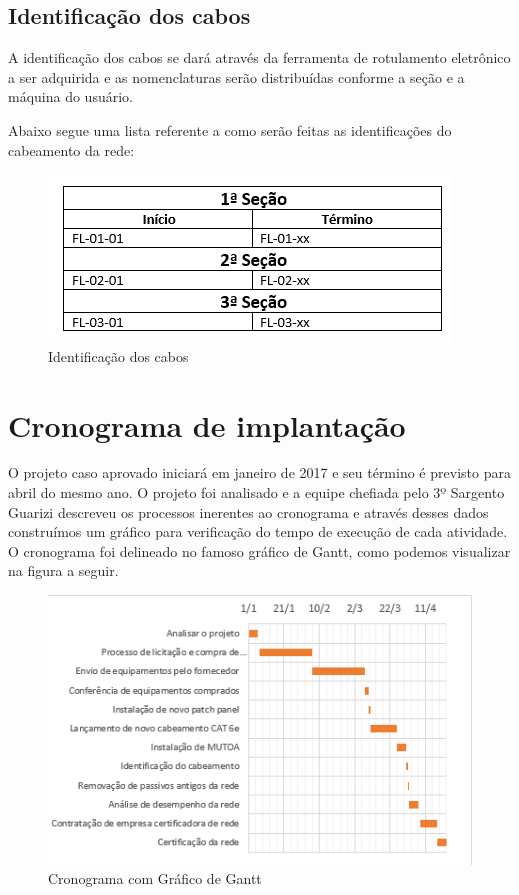 \documentclass[12pt, a4paper]{article}
\begin{document}
	\subsection{Identificação dos cabos}
	A identificação dos cabos se dará através da ferramenta de rotulamento eletrônico a ser adquirida e as nomenclaturas serão distribuídas conforme a seção e a máquina do usuário.
	\par 
	Abaixo segue uma lista referente a como serão feitas as  identificações do cabeamento da rede:
	\FloatBarrier
	\begin{figure}[!htp]
		\centering
		\includegraphics[scale=0.9]{ident.png}
		\caption{Identificação dos cabos}
	\end{figure}
	\FloatBarrier
	
	\section{Cronograma de implantação}
	O projeto caso aprovado iniciará em janeiro de 2017 e seu término é previsto para abril do mesmo ano. O projeto foi analisado e a equipe chefiada pelo 3º Sargento Guarizi descreveu os processos inerentes ao cronograma e através desses dados construímos um gráfico para verificação do tempo de execução de cada atividade. O cronograma foi delineado no famoso gráfico de Gantt, como podemos visualizar na figura a seguir.
	\FloatBarrier
	\begin{figure}[!htp]
		\centering
		\includegraphics{gantt.png}
		\caption{Cronograma com Gráfico de Gantt}
	\end{figure}
	\FloatBarrier
\end{document}
